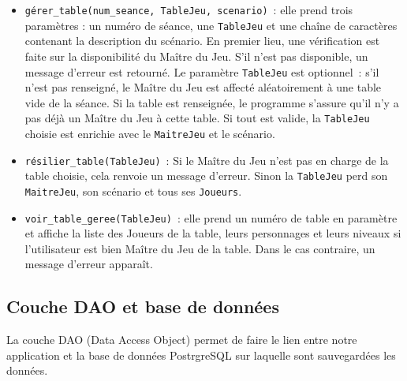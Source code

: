 \documentclass[11pt]{article}
\begin{document}
\begin{itemize}[label=, font=\small]
    \item \texttt{gérer\_table(num\_seance, TableJeu, scenario)}~: elle prend trois paramètres : un numéro de séance, une \texttt{TableJeu} et une chaîne de caractères contenant la description du scénario. En premier lieu, une vérification est faite sur la disponibilité du Maître du Jeu. S'il n'est pas disponible, un message d'erreur est retourné. Le paramètre \texttt{TableJeu} est optionnel~: s'il n'est pas renseigné, le Maître du Jeu est affecté aléatoirement à une table vide de la séance. Si la table est renseignée, le programme s'assure qu'il n'y a pas déjà un Maître du Jeu à cette table. Si tout est valide, la \texttt{TableJeu} choisie est enrichie avec le \texttt{MaitreJeu} et le scénario.
    
    \item \texttt{résilier\_table(TableJeu)}~: Si le Maître du Jeu n'est pas en charge de la table choisie, cela renvoie un message d'erreur. Sinon la \texttt{TableJeu} perd son \texttt{MaitreJeu}, son scénario et tous ses \texttt{Joueurs}.
    
    \item \texttt{voir\_table\_geree(TableJeu)}~: elle prend un numéro de table en paramètre et affiche la liste des Joueurs de la table, leurs personnages et leurs niveaux si l'utilisateur est bien Maître du Jeu de la table. Dans le cas contraire, un message d'erreur apparaît.
\end{itemize}





\subsection{Couche DAO et base de données}

La couche DAO (Data Access Object) permet de faire le lien entre notre application et la base de données PostrgreSQL sur laquelle sont sauvegardées les données.









\end{document}
